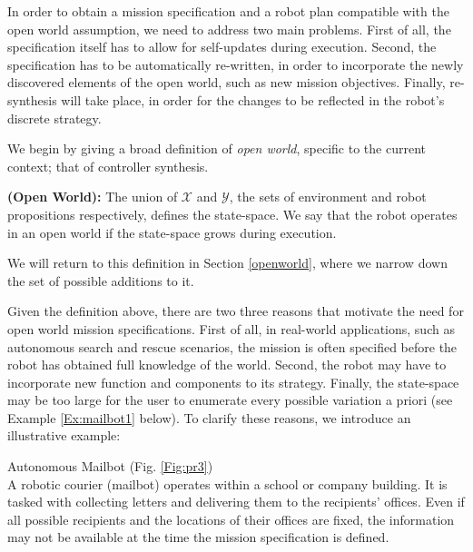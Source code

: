 In order to obtain a mission specification and a robot plan compatible with the open world assumption, we need to address two main problems. First of all, the specification itself has to allow for self-updates during execution. Second, the specification has to be automatically re-written, in order to incorporate the newly discovered elements of the open world, such as new mission objectives. Finally, re-synthesis will take place, in order for the changes to be reflected in the robot's discrete strategy.

We begin by giving a broad definition of \emph{open world}, specific to the current context; that of controller synthesis.

\begin{myDefinition}
	\textbf{(Open World):} The union of $\mathcal{X}$ and $\mathcal{Y}$, the sets of environment and robot propositions respectively, defines the state-space. We say that the robot operates in an open world if the state-space grows during execution.
	\end{myDefinition} 
We will return to this definition in Section \ref{openworld}, where we narrow down the set of possible additions to it.

Given the definition above, there are two three reasons that motivate the need for open world mission specifications. First of all, in real-world applications, such as autonomous search and rescue scenarios, the mission is often specified before the robot has obtained full knowledge of the world. Second, the robot may have to incorporate new function and components to its strategy. Finally, the state-space may be too large for the user to enumerate every possible variation a priori (see Example \ref{Ex:mailbot1} below).  To clarify these reasons, we introduce an illustrative example:

\begin{myExample}\label{Ex:mailbot1} Autonomous Mailbot (Fig. \ref{Fig:pr3})\\
	A robotic courier (mailbot) operates within a school or company building. It is tasked with collecting letters and delivering them to the recipients' offices. Even if all possible recipients and the locations of their offices are fixed, the information may not be available at the time the mission specification is defined. 
\end{myExample}

